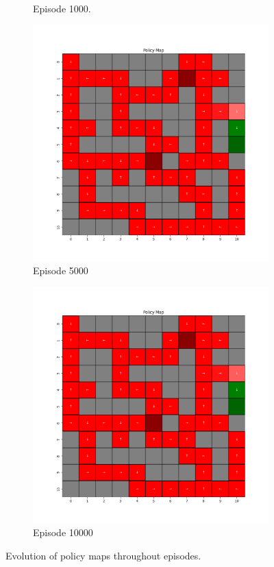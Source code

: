 \documentclass{assignment}
\begin{document}
\begin{figure}[H]
\begin{subfigure}{0.3\textwidth}
    \caption{Episode 1000.}
    \end{subfigure}\hfill
    \begin{subfigure}{0.3\textwidth}
        \includegraphics[width=\textwidth]{figures/policy_q/gamma_sweep/policy_alpha_0.1_gamma_0.25_epsilon_0.2_iteration_5000.png}
    \caption{Episode 5000}
    \end{subfigure}\hfill
    \begin{subfigure}{0.3\textwidth}
        \includegraphics[width=\textwidth]{figures/policy_q/gamma_sweep/policy_alpha_0.1_gamma_0.25_epsilon_0.2_iteration_10000.png}
    \caption{Episode 10000}
    \end{subfigure}
    \caption{Evolution of policy maps throughout episodes.}
    \label{fig:gamma_0.25_q_learning_policy}
\end{figure}
\end{document}
